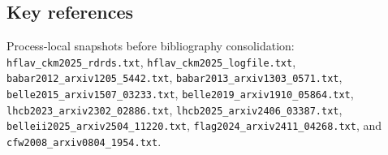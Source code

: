 \subsection*{Key references}
Process-local snapshots before bibliography consolidation:
\texttt{hflav\_ckm2025\_rdrds.txt},
\texttt{hflav\_ckm2025\_logfile.txt},
\texttt{babar2012\_arxiv1205\_5442.txt},
\texttt{babar2013\_arxiv1303\_0571.txt},
\texttt{belle2015\_arxiv1507\_03233.txt},
\texttt{belle2019\_arxiv1910\_05864.txt},
\texttt{lhcb2023\_arxiv2302\_02886.txt},
\texttt{lhcb2025\_arxiv2406\_03387.txt},
\texttt{belleii2025\_arxiv2504\_11220.txt},
\texttt{flag2024\_arxiv2411\_04268.txt}, and
\texttt{cfw2008\_arxiv0804\_1954.txt}.
